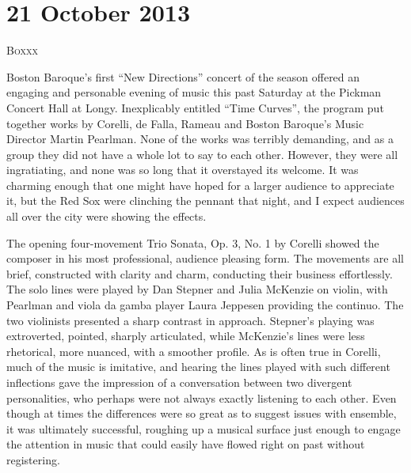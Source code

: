 \chapter{21 October 2013}

\textsc{Boxxx}

Boston Baroque’s first “New Directions” concert of the season offered an engaging and personable evening of music this past Saturday at the Pickman Concert Hall at Longy. Inexplicably entitled “Time Curves”, the program put together works by Corelli, de Falla, Rameau and Boston Baroque’s Music Director Martin Pearlman. None of the works was terribly demanding, and as a group they did not have a whole lot to say to each other. However, they were all ingratiating, and none was so long that it overstayed its welcome. It was charming enough that one might have hoped for a larger audience to appreciate it, but the Red Sox were clinching the pennant that night, and I expect audiences all over the city were showing the effects.

The opening four-movement Trio Sonata, Op. 3, No. 1 by Corelli showed the composer in his most professional, audience pleasing form. The movements are all brief, constructed with clarity and charm, conducting their business effortlessly. The solo lines were played by Dan Stepner and Julia McKenzie on violin, with Pearlman and viola da gamba player Laura Jeppesen providing the continuo. The two violinists presented a sharp contrast in approach. Stepner’s playing was extroverted, pointed, sharply articulated, while McKenzie’s lines were less rhetorical, more nuanced, with a smoother profile. As is often true in Corelli, much of the music is imitative, and hearing the lines played with such different inflections gave the impression of a conversation between two divergent personalities, who perhaps were not always exactly listening to each other. Even though at times the differences were so great as to suggest issues with ensemble, it was ultimately successful, roughing up a musical surface just enough to engage the attention in music that could easily have flowed right on past without registering.

